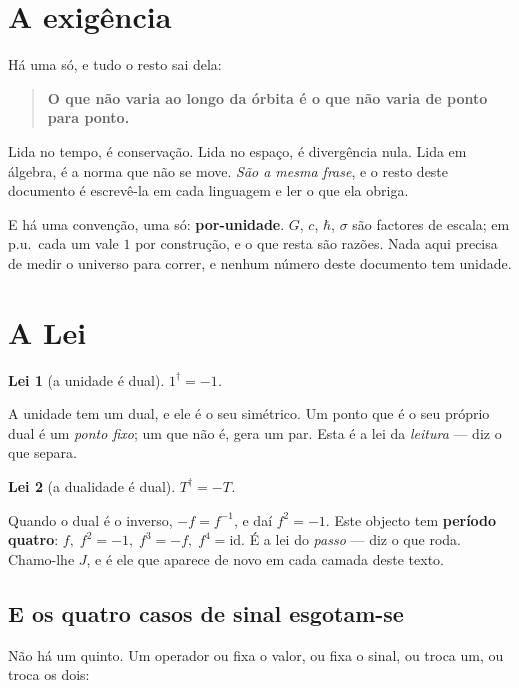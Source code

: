 \documentclass[11pt,a4paper]{article}
\newtheorem{lei}{Lei}
\newcommand{\dg}{^{\dagger}}
\begin{document}
\section{A exigência}

Há uma só, e tudo o resto sai dela:

\begin{quote}
\textbf{O que não varia ao longo da órbita é o que não varia de ponto para ponto.}
\end{quote}

\noindent Lida no tempo, é conservação. Lida no espaço, é divergência nula. Lida em álgebra, é a
norma que não se move. \emph{São a mesma frase}, e o resto deste documento é escrevê-la em cada
linguagem e ler o que ela obriga.

\smallskip
\noindent E há uma convenção, uma só: \textbf{por-unidade}. $G$, $c$, $\hbar$, $\sigma$ são factores
de escala; em p.u.\ cada um vale $1$ por construção, e o que resta são razões. Nada aqui precisa de
medir o universo para correr, e nenhum número deste documento tem unidade.

\section{A Lei}

\begin{lei}[a unidade é dual]
$1\dg=-1$.
\end{lei}

\noindent A unidade tem um dual, e ele é o seu simétrico. Um ponto que é o seu próprio dual é um
\emph{ponto fixo}; um que não é, gera um par. Esta é a lei da \emph{leitura} --- diz o que separa.

\begin{lei}[a dualidade é dual]
$T\dg=-T$.
\end{lei}

\noindent Quando o dual é o inverso, $-f=f^{-1}$, e daí $f^2=-1$. Este objecto tem \textbf{período
quatro}: $f,\;f^2=-1,\;f^3=-f,\;f^4=\mathrm{id}$. É a lei do \emph{passo} --- diz o que roda. Chamo-lhe
$J$, e é ele que aparece de novo em cada camada deste texto.

\subsection*{E os quatro casos de sinal esgotam-se}

Não há um quinto. Um operador ou fixa o valor, ou fixa o sinal, ou troca um, ou troca os dois:
\end{document}
